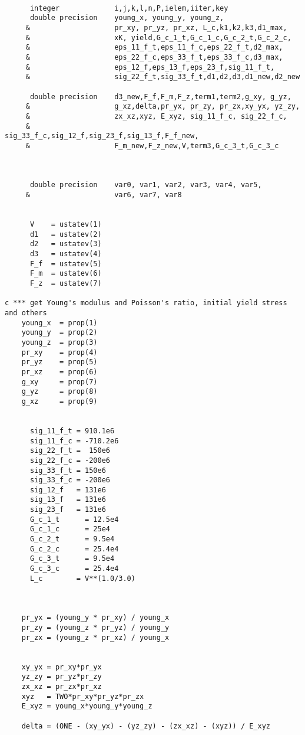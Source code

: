 \begin{lstlisting}
      
      integer             i,j,k,l,n,P,ielem,iiter,key
      double precision    young_x, young_y, young_z,  
     &                    pr_xy, pr_yz, pr_xz, L_c,k1,k2,k3,d1_max,
     &                    xK, yield,G_c_1_t,G_c_1_c,G_c_2_t,G_c_2_c,
     &                    eps_11_f_t,eps_11_f_c,eps_22_f_t,d2_max,
     &                    eps_22_f_c,eps_33_f_t,eps_33_f_c,d3_max,
     &                    eps_12_f,eps_13_f,eps_23_f,sig_11_f_t,
     &                    sig_22_f_t,sig_33_f_t,d1,d2,d3,d1_new,d2_new
      
      double precision    d3_new,F_f,F_m,F_z,term1,term2,g_xy, g_yz, 
     &                    g_xz,delta,pr_yx, pr_zy, pr_zx,xy_yx, yz_zy,
     &                    zx_xz,xyz, E_xyz, sig_11_f_c, sig_22_f_c,
     &                    sig_33_f_c,sig_12_f,sig_23_f,sig_13_f,F_f_new,
     &                    F_m_new,F_z_new,V,term3,G_c_3_t,G_c_3_c

      
      
      double precision    var0, var1, var2, var3, var4, var5,
     &                    var6, var7, var8
	

      V    = ustatev(1)
      d1   = ustatev(2)
      d2   = ustatev(3)
      d3   = ustatev(4)
      F_f  = ustatev(5)
      F_m  = ustatev(6)
      F_z  = ustatev(7) 
      
c *** get Young's modulus and Poisson's ratio, initial yield stress and others
	young_x  = prop(1)
	young_y  = prop(2)
	young_z  = prop(3)
	pr_xy    = prop(4)
	pr_yz    = prop(5)
	pr_xz    = prop(6)
	g_xy     = prop(7)
	g_yz     = prop(8)
	g_xz     = prop(9)
      
      
      sig_11_f_t = 910.1e6
      sig_11_f_c = -710.2e6
      sig_22_f_t =  150e6 
      sig_22_f_c = -200e6
      sig_33_f_t = 150e6
      sig_33_f_c = -200e6
      sig_12_f   = 131e6
      sig_13_f   = 131e6
      sig_23_f   = 131e6
      G_c_1_t      = 12.5e4
      G_c_1_c      = 25e4
      G_c_2_t      = 9.5e4
      G_c_2_c      = 25.4e4
      G_c_3_t      = 9.5e4
      G_c_3_c      = 25.4e4
      L_c        = V**(1.0/3.0)
    
   
      
	pr_yx = (young_y * pr_xy) / young_x
	pr_zy = (young_z * pr_yz) / young_y
	pr_zx = (young_z * pr_xz) / young_x
	
	
	xy_yx = pr_xy*pr_yx
	yz_zy = pr_yz*pr_zy 
	zx_xz = pr_zx*pr_xz
	xyz   = TWO*pr_xy*pr_yz*pr_zx
	E_xyz = young_x*young_y*young_z
	
	delta = (ONE - (xy_yx) - (yz_zy) - (zx_xz) - (xyz)) / E_xyz


\end{lstlisting}
